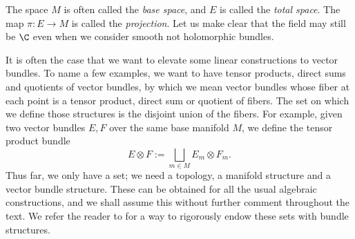The space \(M\) is often called the \textit{base space}, and \(E\) is called the \textit{total space}. The map \(\pi\colon E \to M\) is called the \textit{projection}. Let us make clear that the field may still be \(\C\) even when we consider smooth not holomorphic bundles.   

It is often the case that we want to elevate some linear constructions to vector bundles. To name a few examples, we want to have tensor products, direct sums and quotients of vector bundles, by which we mean vector bundles whose fiber at each point is a tensor product, direct sum or quotient of fibers. The set on which we define those structures is the disjoint union of the fibers. For example, given two vector bundles \(E, F\) over the same base manifold \(M\), we define the tensor product bundle 
\[
E\otimes F:=\bigsqcup_{m \in M} E_m \otimes F_m.
\]
Thus far, we only have a set; we need a topology, a manifold structure and a vector bundle structure. These can be obtained for all the usual algebraic constructions, and we shall assume this without further comment throughout the text. We refer the reader to \parencite[Lemma 10.6]{lee_introSM} for a way to rigorously endow these sets with bundle structures. 

